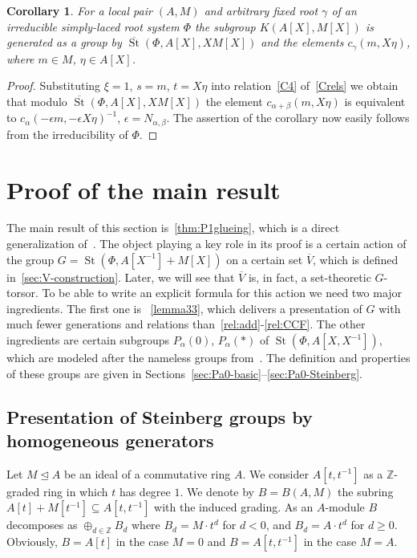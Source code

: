 \documentclass[oneside, 8pt]{amsart}
\newtheorem{corollary}[lemma]{Corollary}
\theoremstyle{remark}
\theoremstyle{definition}
\numberwithin{lemma}{section}
\numberwithin{prop}{section}
\numberwithin{corollary}{section}
\numberwithin{externaltheorem}{section}
\DeclareMathOperator{\St}{St}
\newcommand{\inv}{^{-1}}
\numberwithin{equation}{section}
\begin{document}
\begin{corollary} \label{Kgen-strong} For a local pair $(A, M)$ and arbitrary fixed root $\gamma$ of an irreducible simply-laced root system $\Phi$ the subgroup $K(A[X], M[X])$ is generated as a group by $\overline{\St}(\Phi, A[X], XM[X])$ and the elements $c_{\gamma}(m, X\eta)$, where $m \in M$, $\eta \in A[X]$. \end{corollary}
\begin{proof} Substituting $\xi = 1$, $s = m$, $t = X\eta$ into relation~\eqref{C4} of~\cref{Crels} we obtain that modulo 
 $\overline{\St}(\Phi, A[X], XM[X])$ the element $c_{\alpha + \beta}(m, X\eta)$ is equivalent to $c_{\alpha}(-\epsilon m, -\epsilon X \eta)^{-1}$, $\epsilon = N_{\alpha, \beta}$. The assertion of the corollary now easily follows from the irreducibility of $\Phi$. \end{proof}   

\section{Proof of the main result}
The main result of this section is~\cref{thm:P1glueing}, which is a direct generalization of~\cite[Proposition~4.3]{Tu83}. 
The object playing a key role in its proof is a certain action of the group $G = \St(\Phi, A[X\inv] + M[X])$ on a certain set $\overline{V}$, which is defined in~\cref{sec:V-construction}. Later, we will see that $\overline{V}$ is, in fact, a set-theoretic $G$-torsor.
To be able to write an explicit formula for this action we need two major ingredients. The first one is ~\cref{lemma33}, which delivers a presentation of $G$ with much fewer generations and relations than~\eqref{rel:add}-\eqref{rel:CCF}. The other ingredients are certain subgroups $P_\alpha(0)$, $P_\alpha(*)$ of $\St(\Phi, A[X, X\inv])$, which are modeled after the nameless groups from~\cite[Lemma~3.4]{Tu83}. The definition and properties of these groups are given in Sections~\ref{sec:Pa0-basic}--\ref{sec:Pa0-Steinberg}.

\subsection{Presentation of Steinberg groups by homogeneous generators}
\label{sec:presentation}
Let $M\trianglelefteq A$ be an ideal of a commutative ring $A$.
We consider $A[t, t\inv]$ as a $\mathbb{Z}$-graded ring in which $t$ has degree $1$.
We denote by $B = B(A, M)$ the subring $A[t] + M[t\inv] \subseteq A[t, t\inv]$ with the induced grading.
As an $A$-module $B$ decomposes as $\oplus_{d\in\mathbb Z}B_d$ where $B_d=M \cdot t^d$ for $d<0$, and $B_d=A \cdot t^d$ for $d\geq0$. Obviously, $B = A[t]$ in the case $M=0$ and $B = A[t, t\inv]$ in the case $M=A$.
\end{document}
